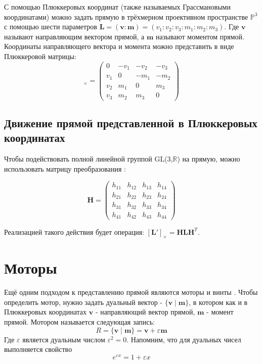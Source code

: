   С помощью Плюккеровых координат (также называемых Грассмановыми координатами) \autocite[Гл. 7]{hodgeMethodsAlgebraicGeometry1994}
  можно задать прямую в трёхмерном проективном пространстве $\mathbb{P}^3$ с помощью шести параметров $\mathbf{L}=(\mathbf{v}:\mathbf{m})=(v_1:v_2:v_3:m_1:m_2:m_3)$.
  Где $\mathbf{v}$ называют направляющим вектором прямой, а $\mathbf{m}$ называют моментом прямой. Координаты направляющего вектора и момента можно представить в виде
  Плюккеровой матрицы: 
  \begin{equation*}
    [\mathbf{L}]_\times = 
    \begin{pmatrix}
      0 & -v_1 & -v_2 & -v_3 \\
      v_1 & 0 & -m_1 & -m_2 \\
      v_2 & m_1 & 0 & m_3 \\
      v_3 & m_2 & m_3 & 0
    \end{pmatrix}
  \end{equation*}
  
  \subsection{Движение прямой представленной в Плюккеровых координатах}

  Чтобы подействовать полной линейной группой  GL(3,$\mathbb{R}$) на прямую, можно использовать матрицу преобразования 
  \autocite[Гл. 3.2, секция II. Plücker matrices, пункт 5]{hartley2003multiple}: 

  \begin{equation*}
    \mathbf{H} =
    \begin{pmatrix}
      h_{11} & h_{12} & h_{13} & h_{14} \\
      h_{21} & h_{22} & h_{23} & h_{24} \\
      h_{31} & h_{32} & h_{33} & h_{34} \\
      h_{41} & h_{42} & h_{43} & h_{44} 
  \end{pmatrix}
  \end{equation*}

  Реализацией такого действия будет операция: $[\mathbf{L}']_\times = \mathbf{HLH}^T$.

  \section{Моторы}

  Ещё одним подходом к представлению прямой являются моторы и винты \autocite{dimentberg1965винтовое}. Чтобы определить мотор, нужно задать дуальный вектор
  - $\{\mathbf{v} \mid \mathbf{m}\}$, в котором как и в Плюккеровых координатах $\mathbf{v}$ - направляющий вектор прямой, $\mathbf{m}$ - момент прямой.
  Мотором называется следующая запись: 
  \begin{equation*}
    R = \{ \mathbf{v} \mid \mathbf{m} \} = \mathbf{v} + \varepsilon \mathbf{m}
  \end{equation*}
  Где $\varepsilon$ является дуальным числом $\varepsilon^2=0$. Напомним, что для дуальных чисел выполняется свойство
  \begin{equation*}
    e^{\varepsilon x} = 1 + \varepsilon x
  \end{equation*}

